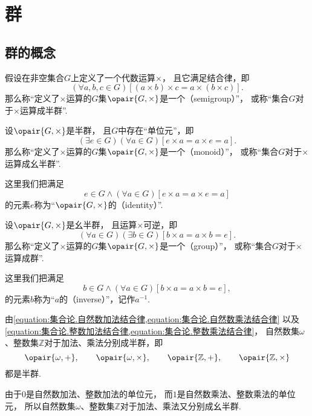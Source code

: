 \section{群}
\subsection{群的概念}
\begin{definition}
假设在非空集合\(G\)上定义了一个代数运算\(\times\)，
且它满足结合律，即\[
	(\forall a,b,c \in G)
	[(a \times b) \times c = a \times (b \times c)].
\]
那么称“定义了\(\times\)运算的\(G\)集\(\opair{G,\times}\)是一个（semigroup）”，
或称“集合\(G\)对于\(\times\)运算成半群”.
\end{definition}

\begin{definition}
设\(\opair{G,\times}\)是半群，
且\(G\)中存在“单位元”，即\[
	(\exists e \in G)(\forall a \in G)
	[e \times a = a \times e = a].
\]
那么称“定义了\(\times\)运算的\(G\)集\(\opair{G,\times}\)是一个（monoid）”，
或称“集合\(G\)对于\(\times\)运算成幺半群”.

这里我们把满足\[
	e \in G
	\land
    (\forall a \in G)
    [e \times a = a \times e = a]
\]的元素\(e\)称为“\(\opair{G,\times}\)的（identity）”.
\end{definition}

\begin{definition}
设\(\opair{G,\times}\)是幺半群，
且运算\(\times\)可逆，即\[
	(\forall a \in G)(\exists b \in G)
	[b \times a = a \times b = e].
\]
那么称“定义了\(\times\)运算的\(G\)集\(\opair{G,\times}\)是一个（group）”，
或称“集合\(G\)对于\(\times\)运算成群”.

这里我们把满足\[
	b \in G
	\land
	(\forall a \in G)
    [b \times a = a \times b = e],
\]
的元素\(b\)称为“\(a\)的（inverse）”，记作\(a^{-1}\).
\end{definition}

由\cref{equation:集合论.自然数加法结合律,equation:集合论.自然数乘法结合律}
以及\cref{equation:集合论.整数加法结合律,equation:集合论.整数乘法结合律}，
自然数集\(\omega\)、整数集\(\mathbb{Z}\)对于加法、乘法分别成半群，即\[
	\opair{\omega,+}, \qquad
	\opair{\omega,\times}, \qquad
	\opair{\mathbb{Z},+}, \qquad
	\opair{\mathbb{Z},\times}
\]都是半群.

由于\(0\)是自然数加法、整数加法的单位元，
而\(1\)是自然数乘法、整数乘法的单位元，
所以自然数集\(\omega\)、整数集\(\mathbb{Z}\)对于加法、乘法又分别成幺半群.


